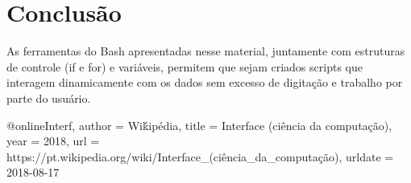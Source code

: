 	\section{Conclusão}
As ferramentas do Bash apresentadas nesse material, juntamente com estruturas de controle (if e for) e variáveis, permitem que sejam criados scripts que interagem dinamicamente com os dados sem excesso de digitação e trabalho por parte do usuário.

@online{Interf,
  author = {Wiḱipédia},
  title = {Interface (ciência da computação)},
  year = 2018,
  url = {https://pt.wikipedia.org/wiki/Interface_(ciência_da_computação)},
  urldate = {2018-08-17}
}

